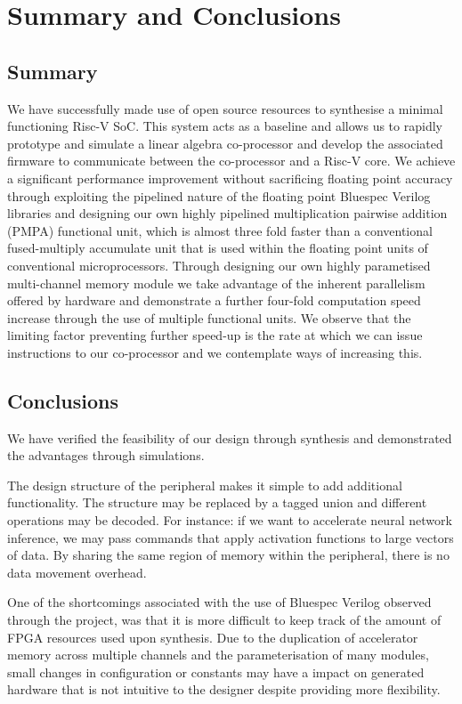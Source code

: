 \documentclass[a4paper,8pt]{report}
\begin{document}
\chapter{Summary and Conclusions} 
\section{Summary}
We have successfully made use of open source resources to synthesise a minimal
functioning Risc-V SoC. This system acts as a baseline and allows us to rapidly
prototype and simulate a linear algebra co-processor and develop the associated
firmware to communicate between the co-processor and a Risc-V core. We achieve
a significant performance improvement without sacrificing floating point
accuracy through exploiting the pipelined nature of the floating point Bluespec
Verilog libraries and designing our own highly pipelined multiplication pairwise
addition (PMPA) functional unit, which is almost three fold faster than a
conventional fused-multiply accumulate unit that is used within the floating
point units of conventional microprocessors. Through designing our own highly
parametised multi-channel memory module we take advantage of the inherent
parallelism offered by hardware and demonstrate a further four-fold computation
speed increase through the use of multiple functional units. We observe that the
limiting factor preventing further speed-up is the rate at which we can issue
instructions to our co-processor and we contemplate ways of increasing this.

\section{Conclusions}
We have verified the feasibility of our design through synthesis and
demonstrated the advantages through simulations.


The design structure of the peripheral makes it simple to add additional
functionality. The structure may be replaced by a tagged union and different
operations may be decoded. For instance: if we want to accelerate neural network
inference, we may pass commands that apply activation functions to large vectors
of data. By sharing the same region of memory within the peripheral, there is no
data movement overhead. 



One of the shortcomings associated with the use of Bluespec Verilog observed
through the project, was that it is more difficult to keep track of the amount
of FPGA resources used upon synthesis. Due to the duplication of accelerator
memory across multiple channels and the parameterisation of many modules, small
changes in configuration or constants may have a impact on generated hardware
that is not intuitive to the designer despite providing more flexibility.
\end{document}

